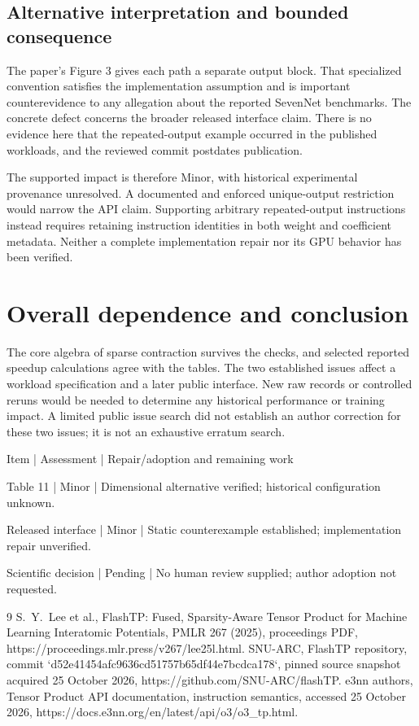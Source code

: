 \documentclass[10pt]{article}
\begin{document}
\subsection*{Alternative interpretation and bounded consequence}
The paper’s Figure 3 gives each path a separate output block. That specialized convention satisfies the implementation assumption and is important counterevidence to any allegation about the reported SevenNet benchmarks. The concrete defect concerns the broader released interface claim. There is no evidence here that the repeated-output example occurred in the published workloads, and the reviewed commit postdates publication.\par
The supported impact is therefore Minor, with historical experimental provenance unresolved. A documented and enforced unique-output restriction would narrow the API claim. Supporting arbitrary repeated-output instructions instead requires retaining instruction identities in both weight and coefficient metadata. Neither a complete implementation repair nor its GPU behavior has been verified.\par
\section*{Overall dependence and conclusion}
The core algebra of sparse contraction survives the checks, and selected reported speedup calculations agree with the tables. The two established issues affect a workload specification and a later public interface. New raw records or controlled reruns would be needed to determine any historical performance or training impact. A limited public issue search did not establish an author correction for these two issues; it is not an exhaustive erratum search.\par
Item | Assessment | Repair/adoption and remaining work\par
Table 11 | Minor | Dimensional alternative verified; historical configuration unknown.\par
Released interface | Minor | Static counterexample established; implementation repair unverified.\par
Scientific decision | Pending | No human review supplied; author adoption not requested.\par
9 S. Y. Lee et al., FlashTP: Fused, Sparsity-Aware Tensor Product for Machine Learning Interatomic Potentials, PMLR 267 (2025), proceedings PDF, https://proceedings.mlr.press/v267/lee25l.html. SNU-ARC, FlashTP repository, commit `d52e41454afc9636cd51757b65df44e7bcdca178`, pinned source snapshot acquired 25 October 2026, https://github.com/SNU-ARC/flashTP. e3nn authors, Tensor Product API documentation, instruction semantics, accessed 25 October 2026, https://docs.e3nn.org/en/latest/api/o3/o3\_tp.html.\par
\end{document}

